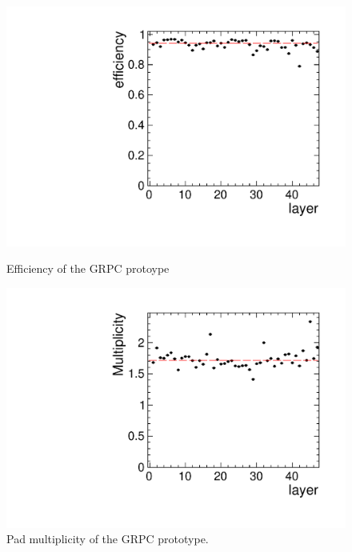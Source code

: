\begin{figure}
\centering
 \begin{minipage}[t]{0.49\textwidth}
 \includegraphics*[width=\textwidth,keepaspectratio]{Calorimeter/SDHCAL_GRPC/figures/eff_layer_august_fit.pdf}
	\caption{Efficiency of the GRPC protoype}
 \label{fig:Calorimeter:SDHCAL_GRPC:Eff}
 \end{minipage}
\hfill
 \begin{minipage}[t]{0.49\textwidth}
 \includegraphics*[width=\textwidth,keepaspectratio]{Calorimeter/SDHCAL_GRPC/figures/mul_layer_august_fit.pdf}
 \caption{Pad multiplicity of the GRPC prototype. }
 \label{fig:Calorimeter:SDHCAL_GRPC:Mult}
 \end{minipage}
 \end{figure}

